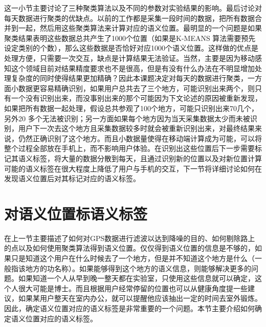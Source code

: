\par 这一小节主要讨论了三种聚类算法以及不同的参数对实验结果的影响。最后讨论对每天数据进行聚类的优缺点。以前的工作都是采集一段时间的数据，把所有数据合并到一起，然后用这些聚类算法来计算对应的语义位置。最明显的一个问题是如果聚类结果表明这些数据总共产生了1000个位置（如果是K-MEANS 算法需要预先设定类别的个数），那么这些数据是否恰好对应1000个语义位置。这样做的优点是处理方便，只需要一次交互，缺点是计算结果无法验证。当然，主要是因为移动感知这个领域目前对结果精度要求也不是很高，但是有没有什么办法在不明显增加处理复杂度的同时使得结果更加精确？因此本课题决定对每天的数据进行聚类，一方面小数据更容易精确识别，如果用户总共去了三个地方，可能识别出来两个，则只有一个没有识别出来，而没事别出来的那个可能因为下文论述的原因被重新发现，如果把所有数据一起处理，假设总共参观了100个地方，可能只识别出来70几个，另外20 多个无法被识别；另一方面如果每个地方因为当天采集数据太少而未被识别，用户下一次去这个地方且采集数据较多时就会被重新识别出来，对最终结果来说，仍然正确识别了这个地方。而且小数据量使得在移动端计算成为可能，可以将整个过程全部放在手机上，而不影响用户体验。在识别出这些位置后下一步需要标记其语义标签，将大量的数据分散到每天，且通过识别新的位置以及对新位置计算可能的语义标签在很大程度上降低了用户与手机的交互，下一节将详细讨论如何在发现语义位置后对其标记对应的语义标签。
\section{对语义位置标语义标签}
\label{sec:section3-3}
在上一节主要描述了如何对GPS数据进行滤波以达到降噪的目的、如何剔除路上的点以及如何使用聚类算法得到语义位置。仅仅得到语义位置的信息是不够的，如果只是知道这个用户在什么时候去了一个地方，但是并不知道这个地方是什么（一般指该地方的功名称）。如果能够得到这个地方的语义信息，则能够解决更多的问题。如果知道一个人从早到晚一整天都在实验室，只使用这些信息就可以确定，这个人很大可能是博士。而且根据用户经常停留的位置也可以从健康角度提一些建议，如果某用户整天在室内办公，就可以提醒他应该抽出一定的时间去室外锻炼。因此，确定语义位置对应的语义标签是非常重要的一个问题。本节主要介绍如何确定语义位置对应的语义标签。
